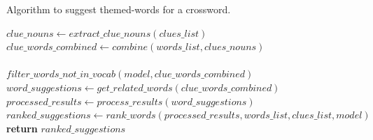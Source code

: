 \documentclass[twoside]{article}
\begin{document}
\begin{algorithm}
  \caption{Algorithm to suggest themed-words for a crossword.}\label{algo:algo1}
  \begin{algorithmic}[1]


      \State $clue\_nouns \gets extract\_clue\_nouns(clues\_list)$ \\

      \State $clue\_words\_combined \gets combine(words\_list, clues\_nouns)$\\
       \\
      $filter\_words\_not\_in\_vocab(model, clue\_words\_combined)$ 
      \\
      \State $word\_suggestions \gets get\_related\_words(clue\_words\_combined)$ 
      \\
      \State $processed\_results \gets process\_results(word\_suggestions)$ \\
      \State $ranked\_suggestions \gets rank\_words(processed\_results, words\_list, clues\_list, model)$ \\
      \State \textbf{return} $ranked\_suggestions$  
      \EndProcedure
  \end{algorithmic}
\end{algorithm}
\end{document}

